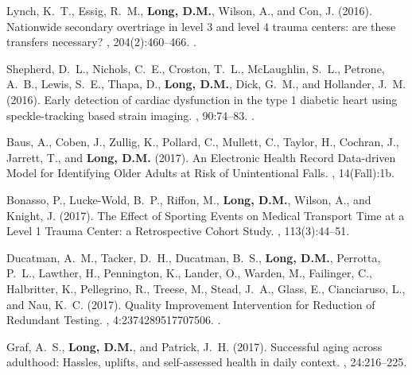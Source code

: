 \begin{thebibliography}{}
Lynch, K.~T., Essig, R.~M., \textbf{Long, D.M.}, Wilson, A., and Con, J. (2016).
\newblock Nationwide secondary overtriage in level 3 and level 4 trauma
  centers: are these transfers necessary?
, 204(2):460--466.
.  


Shepherd, D.~L., Nichols, C.~E., Croston, T.~L., McLaughlin, S.~L., Petrone,
  A.~B., Lewis, S.~E., Thapa, D., \textbf{Long, D.M.}, Dick, G.~M., and Hollander,
  J.~M. (2016).
\newblock Early detection of cardiac dysfunction in the type 1 diabetic heart
  using speckle-tracking based strain imaging.
, 90:74--83.
.  


Baus, A., Coben, J., Zullig, K., Pollard, C., Mullett, C., Taylor, H., Cochran,
  J., Jarrett, T., and \textbf{Long, D.M.} (2017).
\newblock An {Electronic} {Health} {Record} {Data}-driven {Model} for
  {Identifying} {Older} {Adults} at {Risk} of {Unintentional} {Falls}.
, 14(Fall):1b.
 


Bonasso, P., Lucke-Wold, B.~P., Riffon, M., \textbf{Long, D.M.}, Wilson, A., and Knight,
  J. (2017).
\newblock The {Effect} of {Sporting} {Events} on {Medical} {Transport} {Time}
  at a {Level} 1 {Trauma} {Center}: a {Retrospective} {Cohort} {Study}.
, 113(3):44--51.
 


Ducatman, A.~M., Tacker, D.~H., Ducatman, B.~S., \textbf{Long, D.M.}, Perrotta, P.~L.,
  Lawther, H., Pennington, K., Lander, O., Warden, M., Failinger, C.,
  Halbritter, K., Pellegrino, R., Treese, M., Stead, J.~A., Glass, E.,
  Cianciaruso, L., and Nau, K.~C. (2017).
\newblock Quality {Improvement} {Intervention} for {Reduction} of {Redundant}
  {Testing}.
, 4:2374289517707506.
.  


Graf, A.~S., \textbf{Long, D.M.}, and Patrick, J.~H. (2017).
\newblock Successful aging across adulthood: {Hassles}, uplifts, and
  self-assessed health in daily context.
, 24:216--225.


\end{thebibliography}
